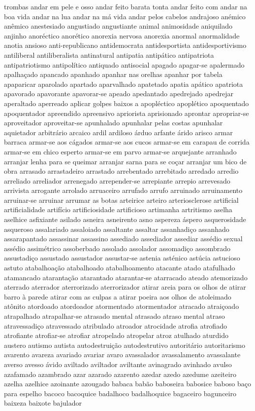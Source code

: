 trombas andar em pele e osso andar feito barata tonta andar feito com andar na boa vida andar na lua andar na m\'{a} vida andar pelos cabelos andrajoso an\'{e}mico an\^{e}mico anestesiado angustiado angustiante animal animosidade aniquilado anjinho anor\'{e}ctico anor\'{e}tico anorexia nervosa anorexia anormal anormalidade anotia ansioso anti-republicano antidemocrata antidesportista antidesportivismo antiliberal antiliberalista antinatural antipatia antip\'{a}tico antipatriota antipatriotismo antipol\'{i}tico antiquado antisocial apagado apagar-se apalermado apalha\c{c}ado apancado apanhado apanhar nas orelhas apanhar por tabela apaparicar aparolado apartado aparvalhado apatetado apatia ap\'{a}tico apatriota apavorado apavorante apavorar-se apeado apedantado apedrejado apedrejar aperaltado aperreado aplicar golpes baixos a apopl\'{e}ctico apopl\'{e}tico apoquentado apoquentador apreendido apreensivo apriorista aprisionado aprontar apropriar-se aproveitador aproveitar-se apunhalado apunhalar pelas costas apunhalar aquietador arbitr\'{a}rio arcaico ardil ardiloso \'{a}rduo arfante \'{a}rido arisco armar barraca armar-se aos c\'{a}gados armar-se aos cucos armar-se em carapau de corrida armar-se em chico esperto armar-se em parvo armar-se arquejante arranhado arranjar lenha para se queimar arranjar sarna para se co\c{c}ar arranjar um bico de obra arrasado arrastadeiro arrastado arrebentado arrebitado arredado arredio arreliado arreliador arrenegado arrepender-se arrepiante arrepio arrevesado arrivista arrogante arrolado arruaceiro arrufado arrufo arruinado arruinamento arruinar-se arruinar arrumar as botas arteirice arteiro arteriosclerose artificial artificialidade artif\'{i}cio artificiosidade artificioso artimanha artritismo aselha aselhice asfixiante asilado asneira asneirento asno aspereza \'{a}spero asquerosidade asqueroso assalariado assaloiado assaltante assaltar assanhadi\c{c}o assanhado assarapantado assassinar assassino assediado assediador assediar ass\'{e}dio sexual ass\'{e}dio assim\'{e}trico assoberbado assolado assolador assomadi\c{c}o assombrado assustadi\c{c}o assustado assustador assustar-se astenia ast\'{e}nico ast\'{u}cia astucioso astuto atabalhoa\c{c}\~ao atabalhoado atabalhoamento atacante atado atafulhado atamancado ataranta\c{c}\~ao atarantado atarantar-se atarracado ateado atemorizado aterrado aterrador aterrorizado aterrorizador atirar areia para os olhos de atirar barro \`{a} parede atirar com as culpas a atirar poeira aos olhos de atoleimado at\^{o}nito atordoado atordoador atormentado atormentador atracado atrai\c{c}oado atrapalhado atrapalhar-se atrasado mental atrasado atraso mental atraso atravessadi\c{c}o atravessado atribulado atroador atrocidade atrofia atrofiado atrofiante atrofiar-se atrofiar atropelado atropelar atroz atulhado aturdido austero autismo autista autodestrui\c{c}\~ao autodestrutivo autorit\'{a}rio autoritarismo avarento avareza avariado avariar avaro avassalador avassalamento avassalante averso avesso \'{a}vido aviltado aviltador aviltante avinagrado avinhado avulso azafamado azambrado azar azarado azarento azedar azedo azedume azeiteiro azelha azelhice azoinante azougado babaca bab\~ao baboseira babosice baboso ba\c{c}o para espelho bacoco bacoquice badalhoco badalhoquice bagaceiro bagunceiro baixeza baixote bajulador 